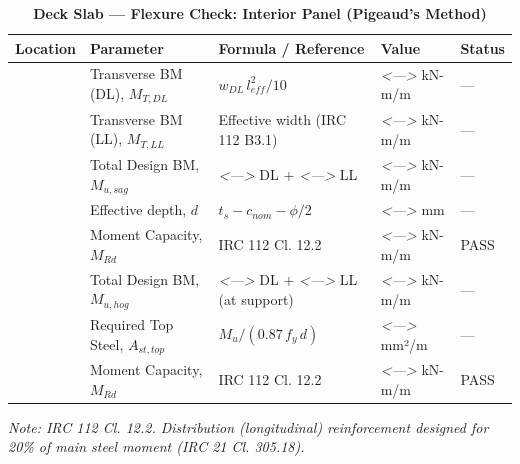 \documentclass[12pt,a4paper]{report}
\numberwithin{table}{chapter}
\numberwithin{figure}{chapter}
\newcommand{\placeholder}[1]{\textit{\textless #1\textgreater}}
\begin{document}
\vspace{1em}
\begin{longtable}{|C{3.0cm}|C{3.5cm}|C{3.0cm}|>{\centering\arraybackslash}p{4.2cm}|C{1.8cm}|}
\caption{\textbf{Deck Slab --- Flexure Check: Interior Panel (Pigeaud's Method)}}
\hline
\textbf{Location} & \textbf{Parameter} & \textbf{Formula / Reference} & \textbf{Value} & \textbf{Status} \\[6pt]
\hline
{} & Transverse BM (DL), $M_{T,DL}$ & $w_{DL}\,l_{eff}^2/10$ & \placeholder{---} kN-m/m & --- \\[6pt]
 & Transverse BM (LL), $M_{T,LL}$ & Effective width (IRC 112 B3.1) & \placeholder{---} kN-m/m & --- \\[6pt]
 & Total Design BM, $M_{u,sag}$ & \placeholder{---} DL + \placeholder{---} LL & \placeholder{---} kN-m/m & --- \\[6pt]
 & Effective depth, $d$ & $t_s - c_{nom} - \phi/2$ & \placeholder{---} mm & --- \\[6pt]
 & Moment Capacity, $M_{Rd}$ & IRC 112 Cl. 12.2 & \placeholder{---} kN-m/m & PASS \\[6pt]
\hline
{} & Total Design BM, $M_{u,hog}$ & \placeholder{---} DL + \placeholder{---} LL (at support) & \placeholder{---} kN-m/m & --- \\[6pt]
 & Required Top Steel, $A_{st,top}$ & $M_u / (0.87\,f_y\,d)$ & \placeholder{---} mm²/m & --- \\[6pt]
 & Moment Capacity, $M_{Rd}$ & IRC 112 Cl. 12.2 & \placeholder{---} kN-m/m & PASS \\[6pt]
\hline
\end{longtable}
\noindent\textit{Note: IRC 112 Cl. 12.2. Distribution (longitudinal) reinforcement designed for 20\% of main steel moment (IRC 21 Cl. 305.18).}
\end{document}
